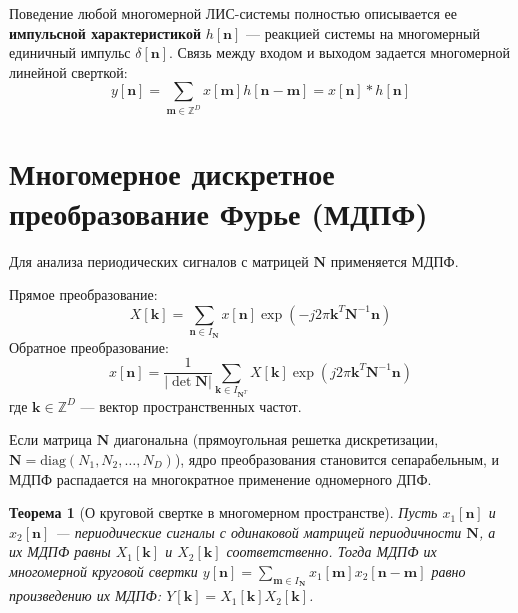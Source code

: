 \documentclass[12pt,a4paper]{article}
\newtheorem{theorem}{Теорема}
\begin{document}
Поведение любой многомерной ЛИС-системы полностью описывается ее \textbf{импульсной характеристикой} $h[\mathbf{n}]$ — реакцией системы на многомерный единичный импульс $\delta[\mathbf{n}]$.
Связь между входом и выходом задается многомерной линейной сверткой:
\begin{equation}
    y[\mathbf{n}] = \sum_{\mathbf{m} \in \mathbb{Z}^D} x[\mathbf{m}] h[\mathbf{n} - \mathbf{m}] = x[\mathbf{n}] \ast h[\mathbf{n}]
\end{equation}

\section{Многомерное дискретное преобразование Фурье (МДПФ)}

Для анализа периодических сигналов с матрицей $\mathbf{N}$ применяется МДПФ.

Прямое преобразование:
\begin{equation}
    X[\mathbf{k}] = \sum_{\mathbf{n} \in I_{\mathbf{N}}} x[\mathbf{n}] \exp\left(-j 2\pi \mathbf{k}^T \mathbf{N}^{-1} \mathbf{n}\right)
\end{equation}
Обратное преобразование:
\begin{equation}
    x[\mathbf{n}] = \frac{1}{|\det \mathbf{N}|} \sum_{\mathbf{k} \in I_{\mathbf{N}^T}} X[\mathbf{k}] \exp\left(j 2\pi \mathbf{k}^T \mathbf{N}^{-1} \mathbf{n}\right)
\end{equation}
где $\mathbf{k} \in \mathbb{Z}^D$ — вектор пространственных частот.

Если матрица $\mathbf{N}$ диагональна (прямоугольная решетка дискретизации, $\mathbf{N} = \text{diag}(N_1, N_2, \dots, N_D)$), ядро преобразования становится сепарабельным, и МДПФ распадается на многократное применение одномерного ДПФ.

\begin{theorem}[О круговой свертке в многомерном пространстве]
Пусть $x_1[\mathbf{n}]$ и $x_2[\mathbf{n}]$ — периодические сигналы с одинаковой матрицей периодичности $\mathbf{N}$, а их МДПФ равны $X_1[\mathbf{k}]$ и $X_2[\mathbf{k}]$ соответственно. Тогда МДПФ их многомерной круговой свертки
$ y[\mathbf{n}] = \sum_{\mathbf{m} \in I_{\mathbf{N}}} x_1[\mathbf{m}] x_2[\mathbf{n} - \mathbf{m}] $
равно произведению их МДПФ: $Y[\mathbf{k}] = X_1[\mathbf{k}] X_2[\mathbf{k}]$.
\end{theorem}
\end{document}
